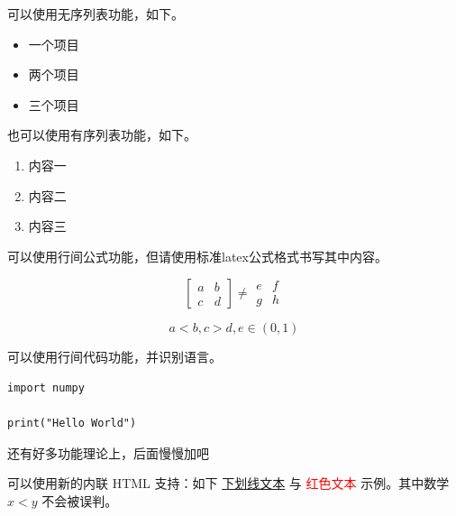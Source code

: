 可以使用无序列表功能，如下。

\begin{itemize}
    \item 一个项目
    \item 两个项目
    \item 三个项目
\end{itemize}

也可以使用有序列表功能，如下。

\begin{enumerate}
    \item 内容一
    \item 内容二
    \item 内容三
\end{enumerate}

可以使用行间公式功能，但请使用标准latex公式格式书写其中内容。

\begin{equation}
    \begin{bmatrix}
    a & b \\ c & d
    \end{bmatrix}
    \neq
    \begin{matrix}
    e & f \\ g & h
    \end{matrix}
    \label{eq:1}
\end{equation}

\begin{equation}
    a<b, c>d, e\in (0,1)
\end{equation}

可以使用行间代码功能，并识别语言。

\begin{verbatim}
import numpy

print("Hello World")
\end{verbatim}

还有好多功能理论上，后面慢慢加吧

可以使用新的内联 HTML 支持：如下 \underline{下划线文本} 与 \textcolor{Red}{红色文本} 示例。其中数学 $x<y$ 不会被误判。


